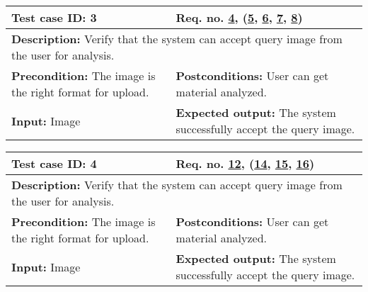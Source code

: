 \begin{table}[H]
\begin{tabular}{|p{7cm}|p{7cm}|}
\hline
\rowcolor[HTML]{D8E9F7} 
\textbf{Test case ID: 3}& \textbf{Req. no. \hyperlink{req:4}{4},  (\hyperlink{req:5}{5}, \hyperlink{req:6}{6}, \hyperlink{req:7}{7}, \hyperlink{req:8}{8})}\\ \hline

\multicolumn{2}{|p{14cm}|}{\textbf{Description:} \newline Verify that the system can accept query image from the user for analysis.} \\ \hline

\textbf{Precondition:} \newline The image is the right format for upload.& 
\textbf{Postconditions:} \newline User can get material analyzed.\\ \hline

\textbf{Input:} \newline
Image&
\textbf{Expected output:} \newline
The system successfully accept the query image.\\ \hline
\end{tabular}
\end{table}

\begin{table}[H]
\begin{tabular}{|p{7cm}|p{7cm}|}
\hline
\rowcolor[HTML]{D8E9F7} 
\textbf{Test case ID: 4}& \textbf{Req. no. \hyperlink{req:12}{12},  (\hyperlink{req:14}{14}, \hyperlink{req:15}{15}, \hyperlink{req:16}{16})}\\ \hline

\multicolumn{2}{|p{14cm}|}{\textbf{Description:} \newline Verify that the system can accept query image from the user for analysis.} \\ \hline

\textbf{Precondition:} \newline The image is the right format for upload.& 
\textbf{Postconditions:} \newline User can get material analyzed.\\ \hline

\textbf{Input:} \newline
Image&
\textbf{Expected output:} \newline
The system successfully accept the query image.\\ \hline
\end{tabular}
\end{table}

